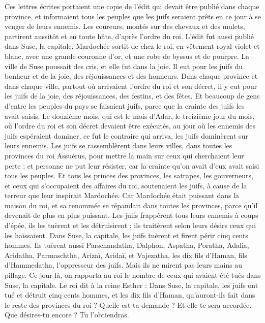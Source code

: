 \begin{multicols}{2}
Ces lettres écrites portaient une copie de l’édit qui devait être publié dans chaque province, et informaient tous les peuples que les juifs seraient prêts en ce jour à se venger de leurs ennemis.
Les coureurs, montés sur des chevaux et des mulets, partirent aussitôt et en toute hâte, d’après l’ordre du roi. L'édit fut aussi publié dans Suse, la capitale.
Mardochée sortit de chez le roi, en vêtement royal violet et blanc, avec une grande couronne d'or, et une robe de byssus et de pourpre. La ville de Suse poussait des cris, et elle fut dans la joie.
Il eut pour les juifs du bonheur et de la joie, des réjouissances et des honneurs.
Dans chaque province et dans chaque ville, partout où arrivaient l’ordre du roi et son décret, il y eut pour les juifs de la joie, des réjouissances, des festins, et des fêtes. Et beaucoup de gens d'entre les peuples du pays se faisaient juifs, parce que la crainte des juifs les avait saisis.
\VerseOne{}Le douzième mois, qui est le mois d'Adar, le treizième jour du mois, où l’ordre du roi et son décret devaient être exécutés, au jour où les ennemis des juifs espéraient dominer, ce fut le contraire qui arriva, les juifs dominèrent sur leurs ennemis.
Les juifs se rassemblèrent dans leurs villes, dans toutes les provinces du roi Assuérus, pour mettre la main sur ceux qui cherchaient leur perte ; et personne ne put leur résister, car la crainte qu'on avait d'eux avait saisi tous les peuples.
Et tous les princes des provinces, les satrapes, les gouverneurs, et ceux qui s’occupaient des affaires du roi, soutenaient les juifs, à cause de la terreur que leur inspirait Mardochée.
Car Mardochée était puissant dans la maison du roi, et sa renommée se répandait dans toutes les provinces, parce qu’il devenait de plus en plus puissant.
Les juifs frappèrent tous leurs ennemis à coups d'épée, ils les tuèrent et les détruisirent ; ils traitèrent selon leurs désirs ceux qui les haïssaient.
Dans Suse, la capitale, les juifs tuèrent et firent périr cinq cents hommes.
Ils tuèrent aussi Parschandatha, Dalphon, Aspatha,
Poratha, Adalia, Aridatha,
Parmaschtha, Arizaï, Aridaï, et Vajezatha,
les dix fils d'Haman, fils d'Hammedatha, l'oppresseur des juifs. Mais ils ne mirent pas leurs mains au pillage.
Ce jour-là, on rapporta au roi le nombre de ceux qui avaient été tués dans Suse, la capitale.
Le roi dit à la reine Esther : Dans Suse, la capitale, les juifs ont tué et détruit cinq cents hommes, et les dix fils d'Haman, qu'auront-ils fait dans le reste des provinces du roi ? Quelle est ta demande ? Et elle te sera accordée. Que désires-tu encore ? Tu l’obtiendras.

\end{multicols}
